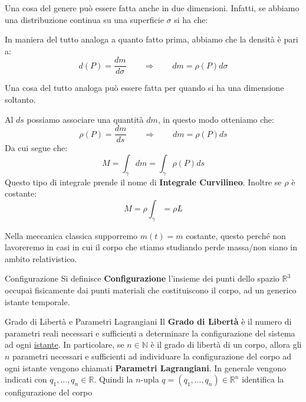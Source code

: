 \documentclass[11pt,a4paper,twoside]{article}
\theoremstyle{definition}
\begin{document}
Una cosa del genere può essere fatta anche in due dimensioni. Infatti, se abbiamo una distribuzione continua su una superficie $\sigma$ si ha che:

\begin{center}
\end{center}

In maniera del tutto analoga a quanto fatto prima, abbiamo che la densità è pari a:
\[d(P) = \frac{dm}{d\sigma} \qquad \Rightarrow \qquad dm = \rho(P)d \sigma\]

Una cosa del tutto analoga può essere fatta per quando si ha una dimensione soltanto.
\begin{center}
\end{center}
Al $ds$ possiamo associare una quantità $dm$, in questo modo otteniamo che:
\[ \rho(P) = \frac{dm}{ds} \qquad \Rightarrow \qquad dm = \rho(P)ds \]
Da cui segue che:
\[ M = \int_\gamma dm = \int_\gamma \rho(P)ds \]
Questo tipo di integrale prende il nome di \textbf{Integrale Curvilineo}. Inoltre se $\rho$ è costante:
\[ M = \rho\int_\gamma = \rho L \]

Nella meccanica classica supporremo $m(t) = m$ costante, questo perché non lavoreremo in casi in cui il corpo che stiamo studiando perde massa/non siano in ambito relativistico.

\begin{defn}{Configurazione}{}
	Si definisce \textbf{Configurazione} l'insieme dei punti dello spazio $\mathbb R^3$ occupai fisicamente dai punti materiali che costituiscono il corpo, ad un generico istante temporale.
\end{defn}

\begin{defn}{Grado di Libertà e Parametri Lagrangiani}{}
	Il \textbf{Grado di Libertà} è il numero di parametri reali necessari e sufficienti a determinare la configurazione del sistema ad ogni \underline{istante}. In particolare, se $n \in \mathbb N$ è il grado di libertà di un corpo, allora gli $n$ parametri necessari e sufficienti ad individuare la configurazione del corpo ad ogni istante vengono chiamati \textbf{Parametri Lagrangiani}. In generale vengono indicati con $q_1,...,q_n \in \mathbb R$. Quindi la $n$-upla $q = (q_1,...,q_n)\in\mathbb R^n$ identifica la configurazione del corpo
\end{defn}
\end{document}
